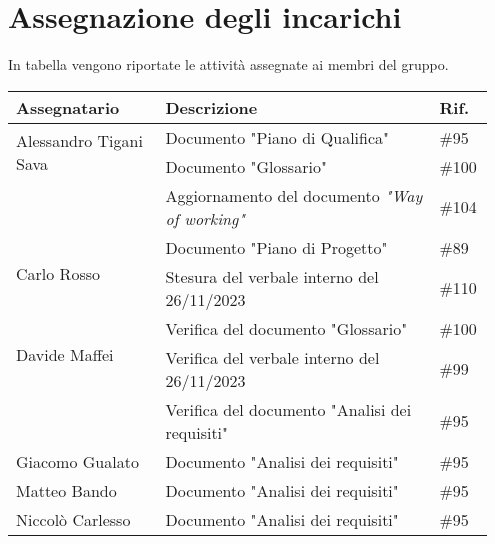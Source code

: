 \section{Assegnazione degli incarichi}
In tabella vengono riportate le attività assegnate ai membri del gruppo.
\begin{center}
	{
		\renewcommand{\arraystretch}{1.5}
		\begin{tabular}{p{0.30\linewidth}|p{0.55\linewidth}|p{0.10\linewidth}}
			\textbf{Assegnatario}                   & \textbf{Descrizione}                                  & \textbf{Rif.} \\
			\hline
			\multirow{2}{*}{Alessandro Tigani Sava} & Documento "Piano di Qualifica"                        & \#95          \\
			\cline{2-3}
			                                        & Documento "Glossario"                                 & \#100         \\
			\cline{2-3}
			                                        & Aggiornamento del documento \textit{"Way of working"} & \#104         \\
			\hline
			\multirow{2}{*}{Carlo Rosso}            & Documento "Piano di Progetto"                         & \#89          \\
			\cline{2-3}
			                                        & Stesura del verbale interno del 26/11/2023            & \#110         \\
			\hline
			\multirow{2}{*}{Davide Maffei}          & Verifica del documento "Glossario"                    & \#100         \\
			\cline{2-3}
			                                        & Verifica del verbale interno del 26/11/2023           & \#99          \\
			\cline{2-3}
			                                        & Verifica del documento "Analisi dei requisiti"        & \#95          \\
			\hline
			Giacomo Gualato                         & Documento "Analisi dei requisiti"                     & \#95          \\
			\hline
			Matteo Bando                            & Documento "Analisi dei requisiti"                     & \#95          \\
			\hline
			Niccolò Carlesso                        & Documento "Analisi dei requisiti"                     & \#95          \\
			\hline
		\end{tabular}
	}
\end{center}
